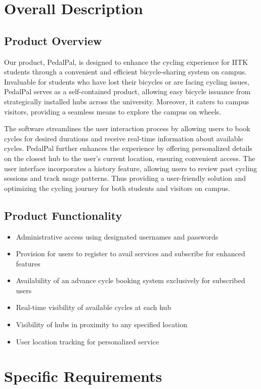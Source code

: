 \documentclass[11pt]{article}
\begin{document}
\newpage
\section{Overall Description}
\subsection{Product Overview}
Our product, PedalPal, is designed to enhance the cycling experience for IITK students through a convenient and efficient bicycle-sharing system on campus. Invaluable for students who have lost their bicycles or are facing cycling issues, PedalPal serves as a self-contained product, allowing easy bicycle issuance from strategically installed hubs across the university. Moreover, it caters to campus visitors, providing a seamless means to explore the campus on wheels. 

The software streamlines the user interaction process by allowing users to book cycles for desired durations and receive real-time information about available cycles. PedalPal further enhances the experience by offering personalized details on the closest hub to the user's current location, ensuring convenient access. The user interface incorporates a history feature, allowing users to review past cycling sessions and track usage patterns. Thus providing a user-friendly solution and optimizing the cycling journey for both students and visitors on campus.

\subsection{Product Functionality}
\begin{itemize}
    \item Administrative access using designated usernames and passwords
    \item Provision for users to register to avail services and subscribe for enhanced features
    \item Availability of an advance cycle booking system exclusively for subscribed users
    \item Real-time visibility of available cycles at each hub
    \item Visibility of hubs in proximity to any specified location
    \item User location tracking for personalized service
\end{itemize}

\newpage
\section{Specific Requirements}
\end{document}
